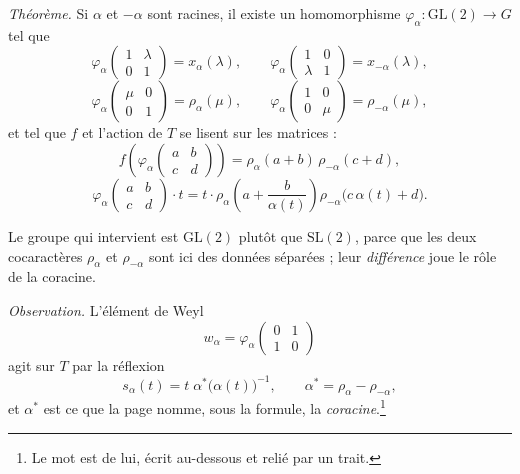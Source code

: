 \documentclass[11pt,a4paper]{article}
\begin{document}
\emph{Théorème.} Si $\alpha$ et $-\alpha$ sont racines, il existe un
homomorphisme $\varphi_\alpha : \mathrm{GL}(2) \to G$ tel que
\[
  \varphi_\alpha \begin{pmatrix} 1 & \lambda \\ 0 & 1 \end{pmatrix}
    = x_\alpha(\lambda), \qquad
  \varphi_\alpha \begin{pmatrix} 1 & 0 \\ \lambda & 1 \end{pmatrix}
    = x_{-\alpha}(\lambda),
\]
\[
  \varphi_\alpha \begin{pmatrix} \mu & 0 \\ 0 & 1 \end{pmatrix}
    = \rho_\alpha(\mu), \qquad
  \varphi_\alpha \begin{pmatrix} 1 & 0 \\ 0 & \mu \end{pmatrix}
    = \rho_{-\alpha}(\mu),
\]
et tel que $f$ et l'action de $T$ se lisent sur les matrices :
\[
  f\left(\varphi_\alpha \begin{pmatrix} a & b \\ c & d \end{pmatrix}\right)
    = \rho_\alpha(a+b)\,\rho_{-\alpha}(c+d),
\]
\[
  \varphi_\alpha \begin{pmatrix} a & b \\ c & d \end{pmatrix} \cdot t
    = t \cdot \rho_\alpha\!\left(a + \frac{b}{\alpha(t)}\right)
      \rho_{-\alpha}\bigl(c\,\alpha(t) + d\bigr).
\]

Le groupe qui intervient est $\mathrm{GL}(2)$ plutôt que $\mathrm{SL}(2)$,
parce que les deux cocaractères $\rho_\alpha$ et $\rho_{-\alpha}$ sont ici des
données séparées ; leur \emph{différence} joue le rôle de la coracine.

\emph{Observation.} L'élément de Weyl
\[
  w_\alpha = \varphi_\alpha \begin{pmatrix} 0 & 1 \\ 1 & 0 \end{pmatrix}
\]
agit sur $T$ par la réflexion
\[
  s_\alpha(t) = t\;\alpha^{*}\bigl(\alpha(t)\bigr)^{-1}, \qquad
  \alpha^{*} = \rho_\alpha - \rho_{-\alpha},
\]
et $\alpha^*$ est ce que la page nomme, sous la formule, la
\emph{coracine}.\footnote{Le mot est de lui, écrit au-dessous et relié par un
trait.}
\end{document}
